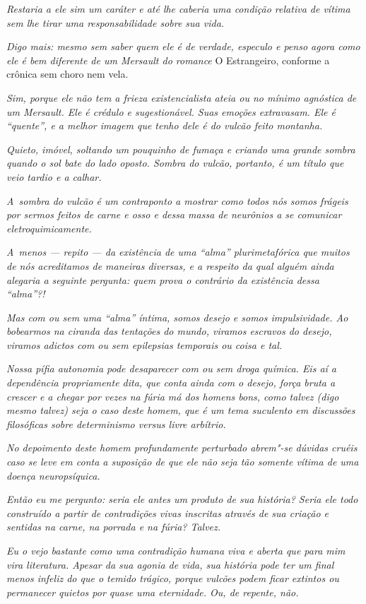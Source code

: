 \emph{Restaria a ele sim um caráter e até lhe caberia uma condição
relativa de vítima sem lhe tirar uma responsabilidade sobre sua vida.}~

\emph{Digo mais: mesmo sem saber quem ele é de verdade, especulo e penso
agora como ele é bem diferente de um Mersault do romance} O Estrangeiro,
{conforme a crônica sem choro nem vela.}~

\emph{Sim, porque ele não tem a frieza existencialista ateia ou no
mínimo agnóstica de um Mersault. Ele é crédulo e sugestionável. Suas
emoções extravasam. Ele é ``quente'', e a melhor imagem que tenho dele é
do vulcão feito montanha.}~

\emph{Quieto, imóvel, soltando um pouquinho de fumaça e criando uma
grande sombra quando o sol bate do lado oposto. Sombra do vulcão,
portanto, é um título que veio tardio e a calhar.}~

\emph{A~sombra do vulcão é um contraponto a mostrar como todos nós somos
frágeis por sermos feitos de carne e osso e dessa massa de neurônios a
se comunicar eletroquimicamente.}~

\emph{A~menos --- repito --- da existência de uma ``alma''
plurimetafórica que muitos de nós acreditamos de maneiras diversas, e a
respeito da qual alguém ainda alegaria a seguinte pergunta: quem prova o
contrário da existência dessa ``alma''?!}~

\emph{Mas com ou sem uma ``alma'' íntima, somos desejo e somos
impulsividade. Ao bobearmos na ciranda das tentações do mundo, viramos
escravos do desejo, viramos adictos com ou sem epilepsias temporais ou
coisa e tal.}~

\emph{Nossa pífia autonomia pode desaparecer com ou sem droga química.
Eis aí a dependência propriamente dita, que conta ainda com o desejo,
força bruta a crescer e a chegar por vezes na fúria má dos homens bons,
como talvez (digo mesmo talvez) seja o caso deste homem, que é um tema
suculento em discussões filosóficas sobre determinismo versus livre
arbítrio.}~

\emph{No depoimento deste homem profundamente perturbado abrem"-se
dúvidas cruéis caso se leve em conta a suposição de que ele não seja tão
somente vítima de uma doença neuropsíquica.}~

\emph{Então eu me pergunto: seria ele antes um produto de sua história?
Seria ele todo construído a partir de contradições vivas inscritas
através de sua criação e sentidas na carne, na porrada e na fúria?
Talvez.}~

\emph{Eu o vejo bastante como uma contradição humana viva e aberta que
para mim vira literatura. Apesar da sua agonia de vida, sua história
pode ter um final menos infeliz do que o temido trágico, porque vulcões
podem ficar extintos ou permanecer quietos por quase uma eternidade. Ou,
de repente, não.}
\endgroup